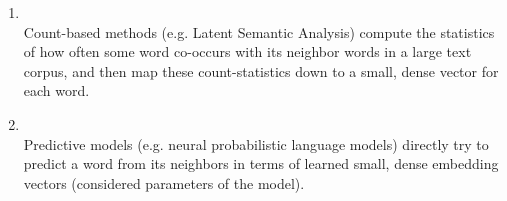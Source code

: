  \begin{enumerate}
      \item\textcite{Count-based methods} \\
          Count-based methods (e.g. Latent Semantic Analysis) compute the statistics of how often some word co-occurs with its neighbor words in a large text corpus, and then map these count-statistics down to a small, dense vector for each word.
      \item\textcite{predictive methods} \\
            Predictive models (e.g. neural probabilistic language models) directly try to predict a word from its neighbors in terms of learned small, dense embedding vectors (considered parameters of the model).
      
  \end{enumerate}
  
